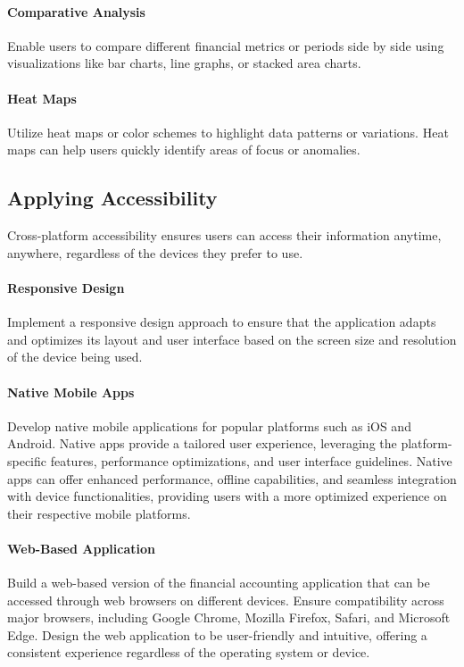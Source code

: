 \paragraph{Comparative Analysis}
Enable users to compare different financial metrics or periods side by side using visualizations like bar charts, 
line graphs, or stacked area charts.

\paragraph{Heat Maps}
Utilize heat maps or color schemes to highlight data patterns or variations. Heat maps can help users quickly identify 
areas of focus or anomalies.


\subsection{Applying Accessibility}

Cross-platform accessibility ensures users can access their information anytime, anywhere, regardless of the devices 
they prefer to use.

\paragraph{Responsive Design}
Implement a responsive design approach to ensure that the application adapts and optimizes its layout and user 
interface based on the screen size and resolution of the device being used.

\paragraph{Native Mobile Apps}
Develop native mobile applications for popular platforms such as iOS and Android. Native apps provide a tailored 
user experience, leveraging the platform-specific features, performance optimizations, and user interface guidelines. 
Native apps can offer enhanced performance, offline capabilities, and seamless integration with device functionalities, 
providing users with a more optimized experience on their respective mobile platforms.

\paragraph{Web-Based Application}
Build a web-based version of the financial accounting application that can be accessed through web browsers on 
different devices. Ensure compatibility across major browsers, including Google Chrome, Mozilla Firefox, Safari, 
and Microsoft Edge. Design the web application to be user-friendly and intuitive, offering a consistent experience 
regardless of the operating system or device.

